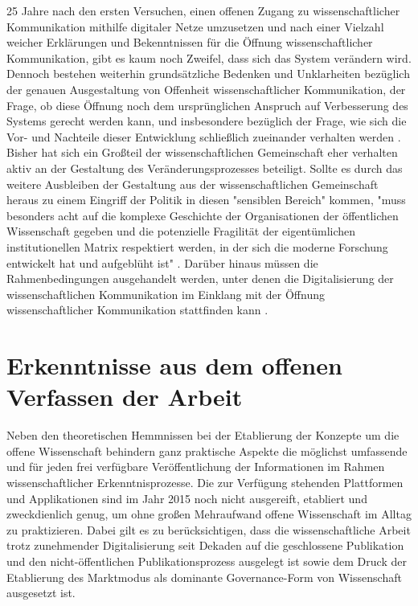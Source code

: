 25 Jahre nach den ersten Versuchen, einen offenen Zugang zu wissenschaftlicher Kommunikation mithilfe digitaler Netze umzusetzen und nach einer Vielzahl weicher Erklärungen und Bekenntnissen für die Öffnung wissenschaftlicher Kommunikation, gibt es kaum noch Zweifel, dass sich das System verändern wird. Dennoch bestehen weiterhin grundsätzliche Bedenken und Unklarheiten bezüglich der genauen Ausgestaltung von Offenheit wissenschaftlicher Kommunikation, der Frage, ob diese Öffnung noch dem ursprünglichen Anspruch auf Verbesserung des Systems gerecht werden kann, und insbesondere bezüglich der Frage, wie sich die Vor- und Nachteile dieser Entwicklung schließlich zueinander verhalten werden \cite{Hagner_2015}. Bisher hat sich ein Großteil der wissenschaftlichen Gemeinschaft eher verhalten aktiv an der Gestaltung des Veränderungsprozesses beteiligt. Sollte es durch das weitere Ausbleiben der Gestaltung aus der wissenschaftlichen Gemeinschaft heraus zu einem Eingriff der Politik in diesen "sensiblen Bereich" kommen, "muss besonders acht auf die komplexe Geschichte der Organisationen der öffentlichen Wissenschaft gegeben und die potenzielle Fragilität der eigentümlichen institutionellen Matrix respektiert werden, in der sich die moderne Forschung entwickelt hat und aufgeblüht ist" \cite{David_1998}. Darüber hinaus müssen die Rahmenbedingungen ausgehandelt werden, unter denen die Digitalisierung der wissenschaftlichen Kommunikation im Einklang mit der Öffnung wissenschaftlicher Kommunikation stattfinden kann \cite{Mennes_2013}.

\section{Erkenntnisse aus dem offenen Verfassen der Arbeit}

Neben den theoretischen Hemmnissen bei der Etablierung der Konzepte um die offene Wissenschaft behindern ganz praktische Aspekte die möglichst umfassende und für jeden frei verfügbare Veröffentlichung der Informationen im Rahmen wissenschaftlicher Erkenntnisprozesse. Die zur Verfügung stehenden Plattformen und Applikationen sind im Jahr 2015 noch nicht ausgereift, etabliert und zweckdienlich genug, um ohne großen Mehraufwand offene Wissenschaft im Alltag zu praktizieren. Dabei gilt es zu berücksichtigen, dass die wissenschaftliche Arbeit trotz zunehmender Digitalisierung seit Dekaden auf die geschlossene Publikation und den nicht-öffentlichen Publikationsprozess ausgelegt ist sowie dem Druck der Etablierung des Marktmodus als dominante Governance-Form von Wissenschaft ausgesetzt ist.


